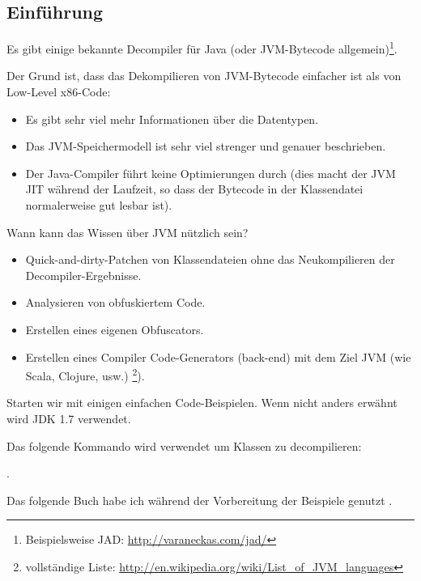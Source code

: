 \subsection{Einführung}

\newcommand{\JADURL}{\url{http://varaneckas.com/jad/}}

Es gibt einige bekannte Decompiler für Java (oder \ac{JVM}-Bytecode
allgemein)\footnote{Beispielsweise JAD: \JADURL}.

Der Grund ist, dass das Dekompilieren von \ac{JVM}-Bytecode einfacher ist als
von Low-Level x86-Code:

\begin{itemize}
\item Es gibt sehr viel mehr Informationen über die Datentypen.
\item Das \ac{JVM}-Speichermodell ist sehr viel strenger und genauer beschrieben.
\item Der Java-Compiler führt keine Optimierungen durch (dies macht der \ac{JVM}
\ac{JIT} während der Laufzeit, so dass der Bytecode in der Klassendatei normalerweise
gut lesbar ist).
\end{itemize}

Wann kann das Wissen über \ac{JVM} nützlich sein?

\newcommand{\URLListOfJVMLangs}{\url{http://en.wikipedia.org/wiki/List_of_JVM_languages}}

\begin{itemize}
\item Quick-and-dirty-Patchen von Klassendateien ohne das Neukompilieren der Decompiler-Ergebnisse.
\item Analysieren von obfuskiertem Code.
\item Erstellen eines eigenen Obfuscators.
\item Erstellen eines Compiler Code-Generators (back-end) mit dem Ziel \ac{JVM}
(wie Scala, Clojure, usw.) \footnote{vollständige Liste: \URLListOfJVMLangs}).
\end{itemize}

Starten wir mit einigen einfachen Code-Beispielen.
Wenn nicht anders erwähnt wird JDK 1.7 verwendet.

Das folgende Kommando wird verwendet um Klassen zu decompilieren:


.

Das folgende Buch habe ich während der Vorbereitung der Beispiele genutzt
\JavaBook.
